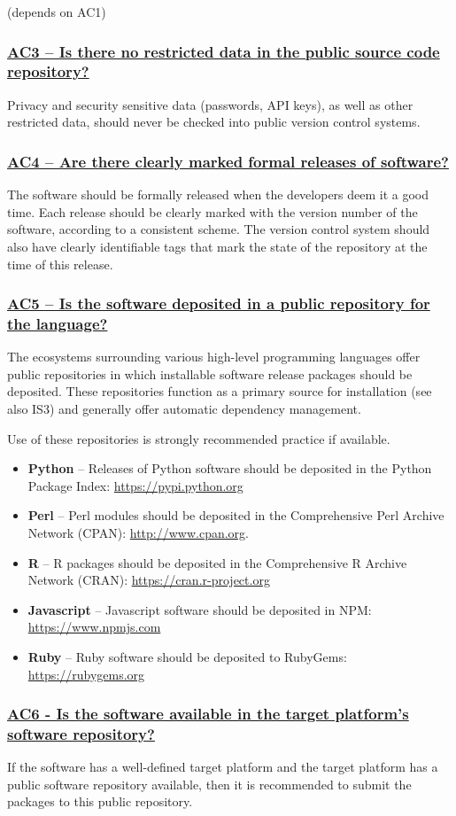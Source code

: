 \documentclass[a4paper,11pt]{article}
\newcommand{\indicator}[1]{\subsubsection*{\underline{#1}}}
\begin{document}
(depends on AC1)

\indicator{AC3 -- Is there no restricted data in the public source code repository?}

Privacy and security sensitive data (passwords, API keys), as well as other
restricted data, should never be checked into public version control systems.

\indicator{AC4 -- Are there clearly marked formal releases of software?}

The software should be formally released when the developers deem it a good
time. Each release should be clearly marked with the version number of the
software, according to a consistent scheme. The version control system should
also have clearly identifiable tags that mark the state of the repository at
the time of this release.


\indicator{AC5 -- Is the software deposited in a public repository for the language?}

The ecosystems surrounding various high-level programming languages offer
public repositories in which installable software release packages should be
deposited. These repositories function as a primary source for installation (see also
IS3) and generally offer automatic dependency management.

Use of these repositories is strongly recommended practice if available.

\begin{itemize}
    \item \textbf{Python} -- Releases of Python software should be deposited in
        the Python Package Index: \url{https://pypi.python.org}
    \item \textbf{Perl} --  Perl modules should be deposited in the Comprehensive
        Perl Archive Network (CPAN): \url{http://www.cpan.org}.
    \item \textbf{R} -- R packages should be deposited in the Comprehensive R
        Archive Network (CRAN): \url{https://cran.r-project.org}
    \item \textbf{Javascript} -- Javascript software should be deposited in
        NPM: \url{https://www.npmjs.com}
    \item \textbf{Ruby} -- Ruby software should be deposited to 
        RubyGems: \url{https://rubygems.org}
\end{itemize}

\indicator{AC6 - Is the software available in the target platform's software repository?}

If the software has a well-defined target platform and the target platform has
a public software repository available, then it is recommended to submit the
packages to this public repository.
\end{document}
